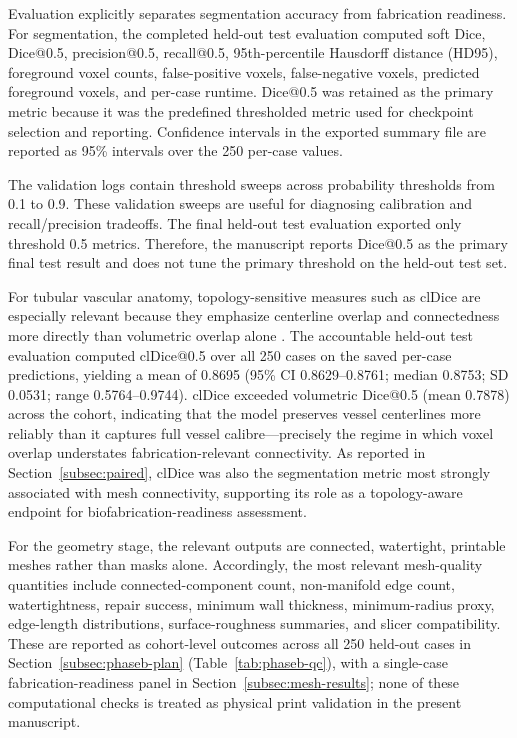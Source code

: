 \documentclass[anonymous]{iopjournal}
\begin{document}
Evaluation explicitly separates segmentation accuracy from fabrication readiness. For segmentation, the completed held-out test evaluation computed soft Dice, Dice@0.5, precision@0.5, recall@0.5, 95th-percentile Hausdorff distance (HD95), foreground voxel counts, false-positive voxels, false-negative voxels, predicted foreground voxels, and per-case runtime. Dice@0.5 was retained as the primary metric because it was the predefined thresholded metric used for checkpoint selection and reporting. Confidence intervals in the exported summary file are reported as 95\% intervals over the 250 per-case values.

The validation logs contain threshold sweeps across probability thresholds from 0.1 to 0.9. These validation sweeps are useful for diagnosing calibration and recall/precision tradeoffs. The final held-out test evaluation exported only threshold 0.5 metrics. Therefore, the manuscript reports Dice@0.5 as the primary final test result and does not tune the primary threshold on the held-out test set.

For tubular vascular anatomy, topology-sensitive measures such as clDice are especially relevant because they emphasize centerline overlap and connectedness more directly than volumetric overlap alone \cite{shit2021}. The accountable held-out test evaluation computed clDice@0.5 over all 250 cases on the saved per-case predictions, yielding a mean of 0.8695 (95\% CI 0.8629--0.8761; median 0.8753; SD 0.0531; range 0.5764--0.9744). clDice exceeded volumetric Dice@0.5 (mean 0.7878) across the cohort, indicating that the model preserves vessel centerlines more reliably than it captures full vessel calibre---precisely the regime in which voxel overlap understates fabrication-relevant connectivity. As reported in Section~\ref{subsec:paired}, clDice was also the segmentation metric most strongly associated with mesh connectivity, supporting its role as a topology-aware endpoint for biofabrication-readiness assessment.

For the geometry stage, the relevant outputs are connected, watertight, printable meshes rather than masks alone. Accordingly, the most relevant mesh-quality quantities include connected-component count, non-manifold edge count, watertightness, repair success, minimum wall thickness, minimum-radius proxy, edge-length distributions, surface-roughness summaries, and slicer compatibility. These are reported as cohort-level outcomes across all 250 held-out cases in Section~\ref{subsec:phaseb-plan} (Table~\ref{tab:phaseb-qc}), with a single-case fabrication-readiness panel in Section~\ref{subsec:mesh-results}; none of these computational checks is treated as physical print validation in the present manuscript.
\end{document}
